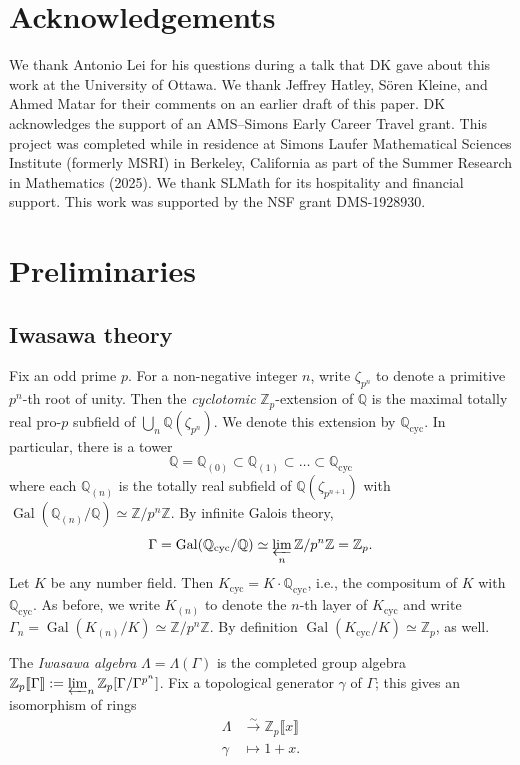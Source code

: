 \documentclass{amsart}
\numberwithin{equation}{section}
\theoremstyle{remark}
\newcommand{\Gal}{\operatorname{Gal}}
\newcommand{\cyc}{\operatorname{cyc}}
\newcommand{\Z}{\mathbb{Z}}
\newcommand{\Zp}{\mathbb{Z}_p}
\newcommand{\Q}{\mathbb{Q}}
\theoremstyle{plain} %
\begin{document}
\section*{Acknowledgements}
We thank Antonio Lei for his questions during a talk that DK gave about this work at the University of Ottawa.
We thank Jeffrey Hatley, Sören Kleine, and Ahmed Matar for their comments on an earlier draft of this paper.
DK acknowledges the support of an AMS--Simons Early Career Travel grant.
This project was completed while in residence at Simons Laufer Mathematical Sciences Institute (formerly MSRI) in Berkeley, California as part of the Summer Research in Mathematics (2025).
We thank SLMath for its hospitality and financial support.
This work was supported by the NSF grant DMS-1928930.


\section{Preliminaries}


\label{sec: preliminary}


\subsection{Iwasawa theory}

Fix an odd prime $p$.
For a non-negative integer $n$, write $\zeta_{p^n}$ to denote a primitive $p^n$-th root of unity.
Then the \emph{cyclotomic} $\Zp$-extension of $\Q$ is the maximal totally real pro-$p$ subfield of $\bigcup_n \Q(\zeta_{p^n})$.
We denote this extension by $\Q_{\cyc}$.
In particular, there is a tower
\[
\Q = \Q_{(0)} \subset \Q_{(1)} \subset \ldots \subset \Q_{\cyc}
\]
where each $\Q_{(n)}$ is the totally real subfield of $\Q(\zeta_{p^{n+1}})$ with $\Gal(\Q_{(n)}/\Q)\simeq \Z/p^n\Z$.
By infinite Galois theory,
\[
\Gamma = \Gal(\Q_{\cyc}/\Q) \simeq \varprojlim_n \Z/p^n\Z = \Zp.
\]
Let $K$ be any number field.
Then $K_{\cyc} = K \cdot \Q_{\cyc}$, i.e., the compositum of $K$ with $\Q_{\cyc}$.
As before, we write $K_{(n)}$ to denote the $n$-th layer of $K_{\cyc}$ and write $\Gamma_n = \Gal(K_{(n)}/K) \simeq \Z/p^n \Z$.
By definition $\Gal(K_{\cyc}/K)\simeq \Zp$, as well.


The \emph{Iwasawa algebra} $\Lambda=\Lambda(\Gamma)$ is the completed group algebra $\Z_p\llbracket \Gamma \rrbracket :=\varprojlim_n \Z_p[\Gamma/\Gamma^{p^n}]$.
Fix a topological generator $\gamma$ of $\Gamma$; this gives an isomorphism of rings 
\begin{align*}
\Lambda &\xrightarrow{\sim} \Z_p\llbracket x\rrbracket \\
\gamma & \mapsto 1+x.
\end{align*}
\end{document}
